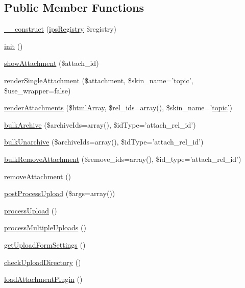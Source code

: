 \subsection*{Public Member Functions}
\begin{DoxyCompactItemize}
\item 
\hyperlink{classclass__attach_a178c3a93e57e75dd87a5d39112af0b07}{\-\_\-\-\_\-construct} (\hyperlink{classips_registry}{ips\-Registry} \$registry)
\item 
\hyperlink{classclass__attach_a4be4055f3361d4800e16bc2e2e38cda6}{init} ()
\item 
\hyperlink{classclass__attach_a96b3e1630819f0b3e47f79304d51ba7f}{show\-Attachment} (\$attach\-\_\-id)
\item 
\hyperlink{classclass__attach_a5e1bb6b05bb3083042be2c15712f3f76}{render\-Single\-Attachment} (\$attachment, \$skin\-\_\-name='\hyperlink{classtopic}{topic}', \$use\-\_\-wrapper=false)
\item 
\hyperlink{classclass__attach_ad6dc6ec2ffa205849a93c01516e53907}{render\-Attachments} (\$html\-Array, \$rel\-\_\-ids=array(), \$skin\-\_\-name='\hyperlink{classtopic}{topic}')
\item 
\hyperlink{classclass__attach_a240cc9cb5f830cbecf1306ac6d5e29e5}{bulk\-Archive} (\$archive\-Ids=array(), \$id\-Type='attach\-\_\-rel\-\_\-id')
\item 
\hyperlink{classclass__attach_ad54cf334f7f82c6d0d4d4cb3a1872460}{bulk\-Unarchive} (\$archive\-Ids=array(), \$id\-Type='attach\-\_\-rel\-\_\-id')
\item 
\hyperlink{classclass__attach_a702b3e9f480aa4b8b7ce36b964da752e}{bulk\-Remove\-Attachment} (\$remove\-\_\-ids=array(), \$id\-\_\-type='attach\-\_\-rel\-\_\-id')
\item 
\hyperlink{classclass__attach_ae283286e87c81aa4c35262085d6a945b}{remove\-Attachment} ()
\item 
\hyperlink{classclass__attach_a14dfb0311160956b8b32460339d2bf98}{post\-Process\-Upload} (\$args=array())
\item 
\hyperlink{classclass__attach_af8f015fa7eafdb43f632ad174d75c66d}{process\-Upload} ()
\item 
\hyperlink{classclass__attach_aaf685fd08b2409d75ca851ba744b3894}{process\-Multiple\-Uploads} ()
\item 
\hyperlink{classclass__attach_a78a4ef2b8d5c9e6ce674b4455ec0ca4b}{get\-Upload\-Form\-Settings} ()
\item 
\hyperlink{classclass__attach_a475f8ef9f96ca4519cb4783f9cf5f132}{check\-Upload\-Directory} ()
\item 
\hyperlink{classclass__attach_aa3be2996a34684827632127725a081e8}{load\-Attachment\-Plugin} ()
\end{DoxyCompactItemize}
